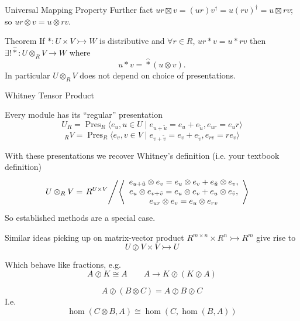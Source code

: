 \documentclass{beamer}
\renewcommand{\hat}[1]{\widehat{#1}}
\DeclareMathOperator{\Pres}{Pres}
\newcommand{\bmto}{\rightarrowtail}
\begin{document}
\begin{frame}{Universal Mapping Property}
    Further fact $ur\boxtimes v=(ur)v^{\dagger}=u(rv)^{\dagger}=u\boxtimes rv$;\\
    so $ur\otimes v=u\otimes r v$.
    
    \begin{block}{Theorem}
        If $*:U\times V\bmto W$ is distributive and $\forall r\in R$, $ur*v=u*rv$ then $\exists ! \hat{*}:U\otimes_R V\to W$ where 
        \[
            u*v = \hat{*}(u\otimes v).
        \]
        In particular $U\otimes_R V$ does not depend on choice of presentations.
    \end{block}

    
\end{frame}

\begin{frame}{Whitney Tensor Product}

    Every module has its ``regular'' presentation
    \[ U_R=\Pres_R\langle e_u, u\in U \mid e_{u+\tilde{u}}=e_u+e_{\tilde{u}}, e_{ur}=e_u r\rangle
        \]
    \[ {_R V}=\Pres_R\langle e_v, v\in V\mid e_{v+\tilde{v}}=e_v+e_{\tilde{v}}, e_{rv}=re_v\rangle
        \]

    With these presentations we recover Whitney's definition (i.e. your textbook definition)
    \begin{align*}
        U\otimes_R V & = 
        \left.
        R^{U\times V}\middle/
        \left\langle \begin{array}{c}
        e_{u+\tilde{u}}\otimes e_v=e_u\otimes e_v+e_{\tilde{u}}\otimes e_v,\\
        e_u\otimes e_{v+\tilde{v}}=e_u\otimes e_v+e_u\otimes e_{\tilde{v}},\\
        e_{ur}\otimes e_v=e_u\otimes e_{rv}
        \end{array}\right\rangle
        \right.
    \end{align*}
    So established methods are a special case.
\end{frame}

\begin{frame}
    Similar ideas picking up on matrix-vector product $R^{m\times n}\times R^n\bmto R^m$ 
    give rise to 
    \[U\oslash V\times V\bmto U\] 

    Which behave like fractions, e.g.\ 
    \[ A\oslash K\cong A\qquad A\to K\oslash (K\oslash A)\]

    \[A\oslash (B\otimes C)=A\oslash B\oslash C\] 
    I.e.
    \[\hom(C\otimes B,A) \cong \hom(C,\hom(B,A))\]
\end{frame}
\end{document}
